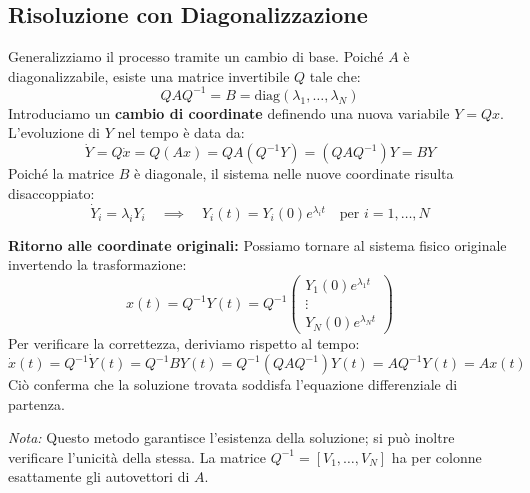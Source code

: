 \documentclass[openany]{book}
\theoremstyle{definition}
\theoremstyle{remark}
\begin{document}
\subsection*{Risoluzione con Diagonalizzazione}
Generalizziamo il processo tramite un cambio di base. Poiché $A$ è diagonalizzabile, esiste una matrice invertibile $Q$ tale che:
\begin{equation}
    Q A Q^{-1} = B = \text{diag}(\lambda_1, \dots, \lambda_N)
\end{equation}
Introduciamo un \textbf{cambio di coordinate} definendo una nuova variabile $Y = Qx$. L'evoluzione di $Y$ nel tempo è data da:
\begin{equation}
    \dot{Y} = Q\dot{x} = Q(Ax) = QA(Q^{-1}Y) = (QAQ^{-1})Y = BY
\end{equation}
Poiché la matrice $B$ è diagonale, il sistema nelle nuove coordinate risulta disaccoppiato:
\begin{equation}
    \dot{Y}_i = \lambda_i Y_i \quad \implies \quad Y_i(t) = Y_i(0) e^{\lambda_i t} \quad \text{per } i=1,\dots,N
\end{equation}

\vspace{0.5cm}
\textbf{Ritorno alle coordinate originali:}
Possiamo tornare al sistema fisico originale invertendo la trasformazione:
\begin{equation}
    x(t) = Q^{-1} Y(t) = Q^{-1} \begin{pmatrix} Y_1(0) e^{\lambda_1 t} \\ \vdots \\ Y_N(0) e^{\lambda_N t} \end{pmatrix}
\end{equation}
Per verificare la correttezza, deriviamo rispetto al tempo:
\begin{equation}
    \dot{x}(t) = Q^{-1} \dot{Y}(t) = Q^{-1} B Y(t) = Q^{-1}(Q A Q^{-1})Y(t) = A Q^{-1} Y(t) = Ax(t)
\end{equation}
Ciò conferma che la soluzione trovata soddisfa l'equazione differenziale di partenza. 

\textit{Nota:} Questo metodo garantisce l'esistenza della soluzione; si può inoltre verificare l'unicità della stessa. La matrice $Q^{-1} =[V_1, \dots, V_N]$ ha per colonne esattamente gli autovettori di $A$.
\end{document}
